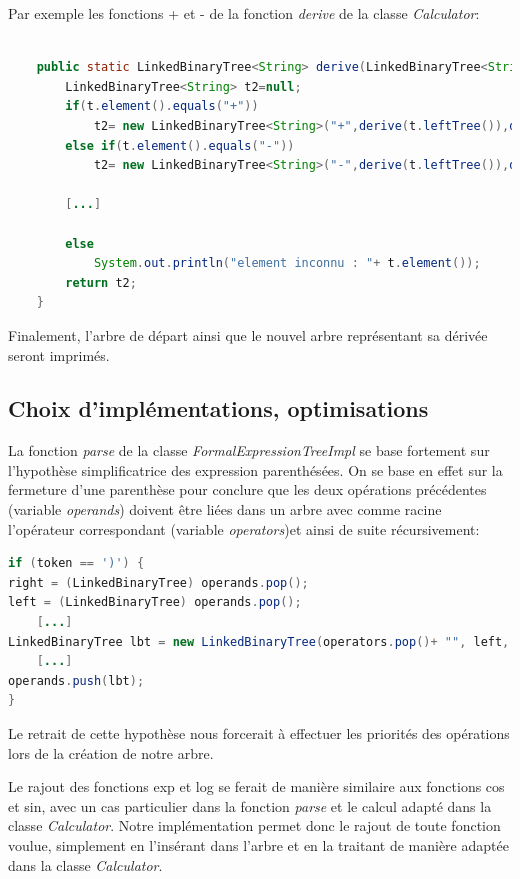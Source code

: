 \documentclass[a4paper]{article}
\begin{document}
Par exemple les fonctions + et - de la fonction \textit{derive} de la classe \textit{Calculator}:
\begin{lstlisting}[language=Java]

	public static LinkedBinaryTree<String> derive(LinkedBinaryTree<String> t){
		LinkedBinaryTree<String> t2=null;		
		if(t.element().equals("+"))
			t2= new LinkedBinaryTree<String>("+",derive(t.leftTree()),derive(t.rightTree()));			
		else if(t.element().equals("-"))
			t2= new LinkedBinaryTree<String>("-",derive(t.leftTree()),derive(t.rightTree()));
		
		[...]
		
		else
			System.out.println("element inconnu : "+ t.element());		
		return t2;	
	}
\end{lstlisting}


Finalement, l'arbre de départ ainsi que le nouvel arbre représentant sa dérivée seront imprimés.	

\subsection*{Choix d'implémentations, optimisations}

La fonction \textit{parse} de la classe \textit{FormalExpressionTreeImpl} se base fortement sur l'hypothèse simplificatrice des expression parenthésées. On se base en effet sur la fermeture d'une parenthèse pour conclure que les deux opérations précédentes (variable \textit{operands}) doivent être liées dans un arbre avec comme racine l'opérateur correspondant (variable \textit{operators})et ainsi de suite récursivement: 

\begin{lstlisting}[language=Java]
if (token == ')') {
right = (LinkedBinaryTree) operands.pop();
left = (LinkedBinaryTree) operands.pop();
	[...]
LinkedBinaryTree lbt = new LinkedBinaryTree(operators.pop()+ "", left, right);
	[...]
operands.push(lbt);
}
\end{lstlisting}

Le retrait de cette hypothèse nous forcerait à effectuer les priorités des opérations lors de la création de notre arbre.


Le rajout des fonctions exp et log se ferait de manière similaire aux fonctions cos et sin, avec un cas particulier dans la fonction  \textit{parse} et le calcul adapté dans la classe \textit{Calculator}. Notre implémentation permet donc le rajout de toute fonction voulue, simplement en l'insérant dans l'arbre et en la traitant de manière adaptée dans la classe \textit{Calculator}.
\end{document}
